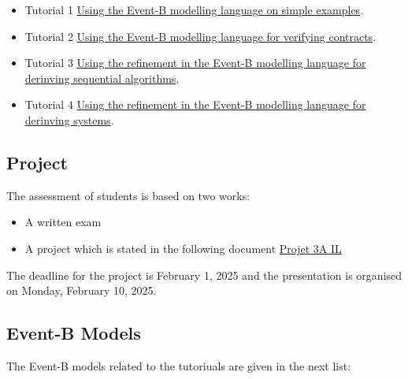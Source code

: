 \documentclass[ 12pt]{article}
\begin{document}
  \begin{itemize}
  \item[]   Tutorial 1
    \href{http://mery54.github.io/teaching/mosos/lecturesnotes/mcfsi-td1.pdf}{Using
      the Event-B modelling language on simple examples}.

   \item[]   Tutorial 2
    \href{http://mery54.github.io/teaching/mosos/lecturesnotes/mcfsi-td2.pdf}{Using
      the Event-B modelling language  for verifying contracts}.



    \item[]   Tutorial 3
    \href{http://mery54.github.io/teaching/mosos/lecturesnotes/mcfsi-td3.pdf}{Using
      the refinement in 
      the Event-B modelling language  for derinving sequential algorithms}.


    
    \item[]   Tutorial 4
    \href{http://mery54.github.io/teaching/mosos/lecturesnotes/mcfsi-td4.pdf}{Using
      the refinement in 
      the Event-B modelling language  for derinving  systems}.


  \end{itemize}

  
  \subsection{Project}
\label{sec:project}

The assessment  of students is based on two works:
\begin{itemize}
\item A written  exam
\item A project which is stated in the following document
  \href{http://mery54.github.io/teaching/mosos/lecturesnotes/telecom-projects2425.pdf}{Projet
    3A IL} 
\end{itemize}

The deadline for the project is  February 1, 2025 and the presentation
is organised on Monday, February 10, 2025. 

  \subsection{Event-B Models}
\label{sec:event-b-models}


The Event-B models related to the tutoriuals are given in the next list: 
\end{document}
